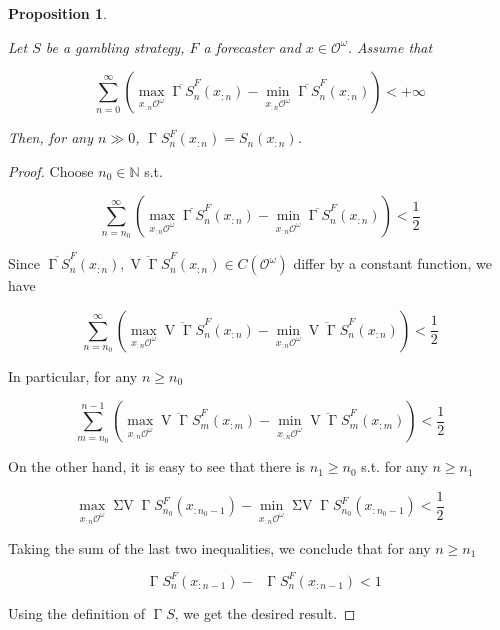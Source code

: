 \documentclass[aop,preprint]{imsart}
\numberwithin{equation}{section}
\theoremstyle{definition}
\theoremstyle{plain}
\newtheorem{proposition}{Proposition}[section]
\newcommand{\Nats}{\mathbb{N}}
\newcommand{\Ob}{\mathcal{O}}
\newcommand{\OO}{\Ob^\omega}
\newcommand{\CO}{C(\OO)}
\DeclareMathOperator{\V}{V}
\DeclareMathOperator{\SV}{\Sigma V}
\DeclareMathOperator{\SVM}{\Sigma V_{\min}}
\DeclareMathOperator{\SVX}{\Sigma V_{\max}}
\DeclareMathOperator{\PG}{\Gamma}
\begin{document}
\begin{samepage}
\begin{proposition}
\label{prp:when_bounded_play}

Let $S$ be a gambling strategy, $F$ a forecaster and $x \in \OO$. Assume that

\begin{equation}
\sum_{n=0}^\infty {\left(\max_{x_{:n}\OO} \overline{\PG{S}}^F_n\left(x_{:n}\right)-\min_{x_{:n}\OO} \overline{\PG{S}}^F_n\left(x_{:n}\right)\right)} < +\infty
\end{equation}

Then, for any $n \gg 0$, $\PG{S}^F_n\left(x_{:n}\right)=S_n\left(x_{:n}\right)$.

\end{proposition}
\end{samepage}

\begin{proof}

Choose $n_0 \in \Nats$ s.t. 

$$\sum_{n=n_0}^\infty {\left(\max_{x_{:n}\OO} \overline{\PG{S}}^F_n\left(x_{:n}\right)-\min_{x_{:n}\OO} \overline{\PG{S}}^F_n\left(x_{:n}\right)\right)} < \frac{1}{2}$$

Since $\overline{\PG{S}}^F_n\left(x_{:n}\right), \overline{\V{\PG{S}}}^F_n\left(x_{:n}\right) \in \CO$ differ by a constant function, we have

$$\sum_{n=n_0}^\infty {\left(\max_{x_{:n}\OO} \overline{\V{\PG{S}}}^F_n\left(x_{:n}\right)-\min_{x_{:n}\OO} \overline{\V{\PG{S}}}^F_n\left(x_{:n}\right)\right)} < \frac{1}{2}$$

In particular, for any $n \geq n_0$

$$\sum_{m=n_0}^{n-1} {\left(\max_{x_{:n}\OO} \overline{\V{\PG{S}}}^F_m\left(x_{:m}\right)-\min_{x_{:n}\OO} \overline{\V{\PG{S}}}^F_m\left(x_{:m}\right)\right)} < \frac{1}{2}$$

On the other hand, it is easy to see that there is $n_1 \geq n_0$ s.t. for any $n \geq n_1$

$$\max_{x_{:n}\OO} \SV{\PG{S}}_{n_0}^F\left(x_{:n_0 - 1}\right) - \min_{x_{:n}\OO} \SV{\PG{S}}_{n_0}^F\left(x_{:n_0 - 1}\right) < \frac{1}{2}$$

Taking the sum of the last two inequalities, we conclude that for any $n \geq n_1$

$$\SVX{\PG{S}}_{n}^F\left(x_{:n-1}\right) - \SVM{\PG{S}}_{n}^F\left(x_{:n-1}\right) < 1$$

Using the definition of $\PG{S}$, we get the desired result.
\end{proof}
\end{document}
